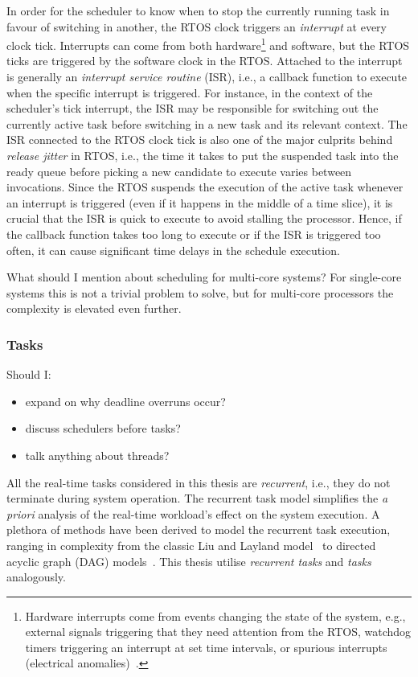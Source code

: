 In order for the scheduler to know when to stop the currently running task in favour of switching in another, the RTOS clock triggers an \emph{interrupt} at every clock tick.
Interrupts can come from both hardware\footnote{Hardware interrupts come from events changing the state of the system, e.g., external signals triggering that they need attention from the RTOS, watchdog timers triggering an interrupt at set time intervals, or spurious interrupts (electrical anomalies)~\addref{}.} and software, but the RTOS ticks are triggered by the software clock in the RTOS.
Attached to the interrupt is generally an \emph{interrupt service routine} (ISR), i.e., a callback function to execute when the specific interrupt is triggered.
For instance, in the context of the scheduler's tick interrupt, the ISR may be responsible for switching out the currently active task before switching in a new task and its relevant context.
The ISR connected to the RTOS clock tick is also one of the major culprits behind \emph{release jitter} in RTOS, i.e., the time it takes to put the suspended task into the ready queue before picking a new candidate to execute varies between invocations.
Since the RTOS suspends the execution of the active task whenever an interrupt is triggered (even if it happens in the middle of a time slice), it is crucial that the ISR is quick to execute to avoid stalling the processor.
Hence, if the callback function takes too long to execute or if the ISR is triggered too often, it can cause significant time delays in the schedule execution.

\question%
{What should I mention about scheduling for multi-core systems?}%
{}
For single-core systems this is not a trivial problem to solve, but for multi-core processors the complexity is elevated even further. 


\subsubsection*{Tasks~}%
\question%
{Should I:
\begin{itemize}
    \item expand on why deadline overruns occur?
    \item discuss schedulers before tasks?
    \item talk anything about threads?
\end{itemize}}%
{}
All the real-time tasks considered in this thesis are \emph{recurrent}, i.e., they do not terminate during system operation.
The recurrent task model simplifies the \emph{a priori} analysis of the real-time workload's effect on the system execution.
A plethora of methods have been derived to model the recurrent task execution, ranging in complexity from the classic Liu and Layland model~\cite{Liu:1973} to directed acyclic graph (DAG) models~\cite{Saifullah:2014}.
This thesis utilise \emph{recurrent tasks} and \emph{tasks} analogously.

